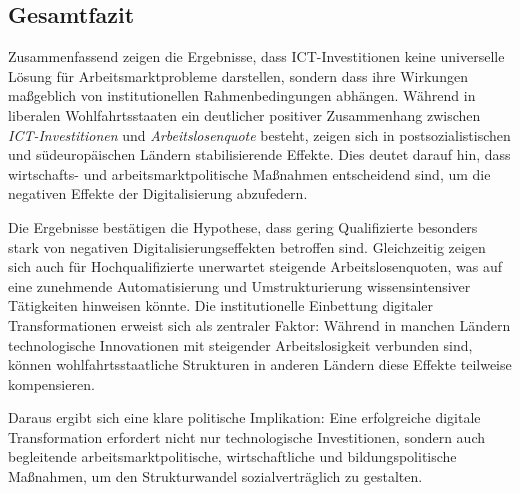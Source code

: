 
\subsection{Gesamtfazit}

Zusammenfassend zeigen die Ergebnisse, dass \ac{ICT}-Investitionen keine universelle Lösung für 
Arbeitsmarktprobleme darstellen, sondern dass ihre Wirkungen maßgeblich von institutionellen 
Rahmenbedingungen abhängen. Während in liberalen Wohlfahrtsstaaten ein deutlicher positiver 
Zusammenhang zwischen \textit{\ac{ICT}-Investitionen} und \textit{Arbeitslosenquote} besteht, 
zeigen sich in postsozialistischen und südeuropäischen Ländern stabilisierende Effekte. Dies 
deutet darauf hin, dass wirtschafts- und arbeitsmarktpolitische Maßnahmen entscheidend sind, um 
die negativen Effekte der Digitalisierung abzufedern.

Die Ergebnisse bestätigen die Hypothese, dass gering Qualifizierte besonders stark von negativen 
Digitalisierungseffekten betroffen sind. Gleichzeitig zeigen sich auch für Hochqualifizierte 
unerwartet steigende Arbeitslosenquoten, was auf eine zunehmende Automatisierung und 
Umstrukturierung wissensintensiver Tätigkeiten hinweisen könnte. Die institutionelle Einbettung 
digitaler Transformationen erweist sich als zentraler Faktor: Während in manchen Ländern 
technologische Innovationen mit steigender Arbeitslosigkeit verbunden sind, können 
wohlfahrtsstaatliche Strukturen in anderen Ländern diese Effekte teilweise kompensieren.

Daraus ergibt sich eine klare politische Implikation: Eine erfolgreiche digitale Transformation 
erfordert nicht nur technologische Investitionen, sondern auch begleitende 
arbeitsmarktpolitische, wirtschaftliche und bildungspolitische Maßnahmen, um den Strukturwandel 
sozialverträglich zu gestalten.
